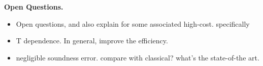 \vspace{2mm} \noindent \textbf{Open Questions.} 


\begin{itemize}
    \item Open questions, and also explain for some associated high-cost. specifically 
    \item T dependence. In general, improve the efficiency.  
    \item negligible soundness error.  compare with classical? what's the state-of-the art. 
\end{itemize}








